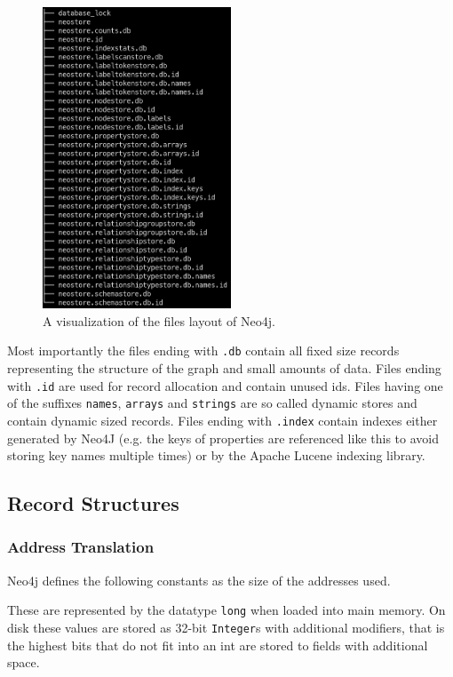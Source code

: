 \documentclass[a4paper,10pt]{article}
\begin{document}
    \begin{figure}[htp]\label{files}
    \begin{center}
    \includegraphics[keepaspectratio,height=0.4\textheight,width=0.5\textwidth]{img/03_record/files.png}
    \end{center}
    \caption{A visualization of the files layout of Neo4j.} %
    \end{figure}

    Most importantly the files ending with \texttt{.db} contain all fixed size records representing the structure of the graph and small amounts of data.
    Files ending with \texttt{.id} are used for record allocation and contain unused ids. Files having one of the suffixes \texttt{names}, \texttt{arrays} and \texttt{strings} are so called dynamic stores and contain dynamic sized records. Files ending with \texttt{.index} contain indexes either generated by Neo4J (e.g. the keys of properties are referenced like this to avoid storing key names multiple times) or by the Apache Lucene indexing library.
    
    
\subsection{Record Structures}
    \subsubsection{Address Translation}
    Neo4j defines the following constants as the size of the addresses used.
        \begin{figure}[htp]\label{addrsize}
    \end{figure}
    These are represented by the datatype \texttt{long} when loaded into main memory. On disk these values are stored as 32-bit \texttt{Integer}s with additional modifiers, that is the highest bits that do not fit into an int are stored to fields with additional space.
    
\end{document}

